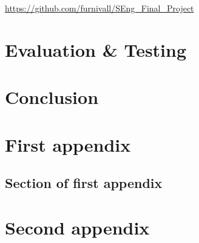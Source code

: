 \documentclass{mproj}
\begin{document}
\begin{center}
\href{https://github.com/furnivall/SEng_Final_Project}{https://github.com/furnivall/SEng\_Final\_Project}
\end{center}

\chapter{Evaluation \& Testing}\label{testing}

\chapter{Conclusion}\label{conclusion}

\appendix %
\chapter{First appendix}

\section{Section of first appendix}

\chapter{Second appendix}

\printbibliography
\end{document}
